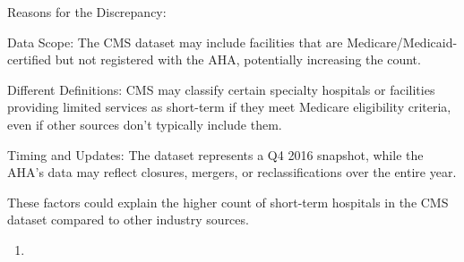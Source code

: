 \documentclass[
  letterpaper,
  DIV=11,
  numbers=noendperiod]{scrartcl}
\providecommand{\tightlist}{%
  \setlength{\itemsep}{0pt}\setlength{\parskip}{0pt}}\usepackage{longtable,booktabs,array}
\begin{document}
Reasons for the Discrepancy:

Data Scope: The CMS dataset may include facilities that are
Medicare/Medicaid-certified but not registered with the AHA, potentially
increasing the count.

Different Definitions: CMS may classify certain specialty hospitals or
facilities providing limited services as short-term if they meet
Medicare eligibility criteria, even if other sources don't typically
include them.

Timing and Updates: The dataset represents a Q4 2016 snapshot, while the
AHA's data may reflect closures, mergers, or reclassifications over the
entire year.

These factors could explain the higher count of short-term hospitals in
the CMS dataset compared to other industry sources.

\begin{enumerate}
\def\labelenumi{\arabic{enumi}.}
\setcounter{enumi}{2}
\tightlist
\item
\end{enumerate}
\end{document}
